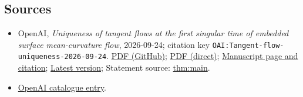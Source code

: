 \documentclass[11pt]{article}
\begin{document}
\subsection{Sources}
\begin{itemize}
\item OpenAI, \emph{Uniqueness of tangent flows at the first singular time of embedded surface mean-curvature flow}, 2026-09-24; citation key \texttt{OAI:Tangent-flow-uniqueness-2026-09-24}. \href{https://github.com/openai/math/blob/adc7f1241b42e322a6451854ab7e4b4c146bf78a/preprints/Tangent-flow-uniqueness-2026-09-24/paper.pdf}{PDF (GitHub)}; \href{https://github.com/openai/math/raw/adc7f1241b42e322a6451854ab7e4b4c146bf78a/preprints/Tangent-flow-uniqueness-2026-09-24/paper.pdf}{PDF (direct)}; \href{https://github.com/openai/math/blob/adc7f1241b42e322a6451854ab7e4b4c146bf78a/preprints/Tangent-flow-uniqueness-2026-09-24/README.md}{Manuscript page and citation}; \href{https://github.com/openai/math/blob/main/preprints/Tangent-flow-uniqueness-2026-09-24/paper.pdf}{Latest version}; Statement source: \href{https://github.com/openai/math/blob/adc7f1241b42e322a6451854ab7e4b4c146bf78a/preprints/Tangent-flow-uniqueness-2026-09-24/build/sections/introduction.tex\#L46}{thm:main}.
\item \href{https://github.com/openai/math/blob/adc7f1241b42e322a6451854ab7e4b4c146bf78a/CONTENTS.md}{OpenAI catalogue entry}.
\end{itemize}
\end{document}

